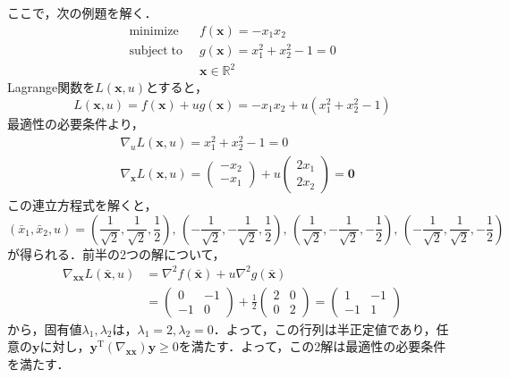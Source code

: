 \documentclass{jsreport}
\begin{document}
ここで，次の例題を解く．
\begin{align}
  \mathrm{minimize} \; \; &f(\bm{x}) = -x_1 x_2 \nonumber\\
  \mathrm{subject \; to} \; \; &g(\bm{x}) = x_1^2 + x_2^2 - 1 = 0 \nonumber \\
  &\bm{x} \in \mathbb{R}^2 \nonumber
\end{align}
Lagrange関数を$L(\bm{x}, u)$とすると，
\begin{equation}
  L(\bm{x}, u) = f(\bm{x}) + u g(\bm{x}) = -x_1 x_2 + u(x_1^2 + x_2^2 - 1) \nonumber
\end{equation}
最適性の必要条件より，
\begin{align}
  &\nabla_u L(\bm{x}, u) = x_1^2 + x_2^2 - 1 = 0 \nonumber \\
  &\nabla_{\bm{x}} L(\bm{x}, u) = \left(
  \begin{array}{c}
    -x_2 \\
    -x_1
  \end{array}
  \right) + u\left(
  \begin{array}{c}
    2x_1 \\
    2x_2
  \end{array}
  \right) = \bm{0} \nonumber
\end{align}
この連立方程式を解くと，
\begin{equation}
  (\bar{x}_1, \bar{x}_2, u) =
  \left(\frac{1}{\sqrt{2}}, \frac{1}{\sqrt{2}}, \frac{1}{2}\right), \,
  \left(- \frac{1}{\sqrt{2}}, - \frac{1}{\sqrt{2}}, \frac{1}{2}\right), \,
  \left(\frac{1}{\sqrt{2}}, - \frac{1}{\sqrt{2}}, - \frac{1}{2}\right), \,
  \left(- \frac{1}{\sqrt{2}}, \frac{1}{\sqrt{2}}, - \frac{1}{2}\right) \nonumber
\end{equation}
が得られる．前半の2つの解について，
\begin{align}
  \nabla_{\bm{xx}} L(\bar{\bm{x}}, u) &= {\nabla}^2 f(\bar{\bm{x}}) + u {\nabla}^2 g(\bar{\bm{x}}) \nonumber \\
  &= \left(
  \begin{array}{cc}
    0 & -1 \\
    -1 & 0
  \end{array}
  \right) + \frac{1}{2} \left(
  \begin{array}{cc}
    2 & 0 \\
    0 & 2
  \end{array}
  \right) = \left(
  \begin{array}{cc}
    1 & -1 \\
    -1 & 1
  \end{array}
  \right) \nonumber
\end{align}
から，固有値$\lambda_1, \lambda_2$は，$\lambda_1 = 2, \lambda_2 = 0$．よって，この行列は半正定値であり，任意の$\bm{y}$に対し，$\bm{y}^{\mathrm{T}} (\nabla_{\bm{xx}}) \bm{y} \geq 0$を満たす．よって，この2解は最適性の必要条件を満たす．
\end{document}
